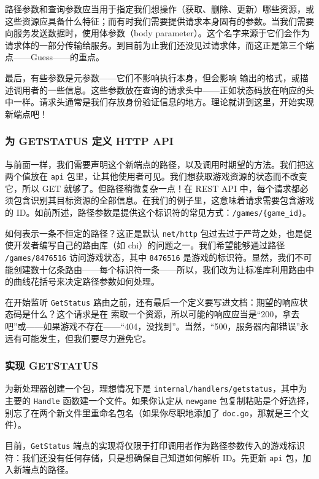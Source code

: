 路径参数和查询参数应当用于指定我们想操作（获取、删除、更新）哪些资源，或这些资源应具备什么特征；而有时我们需要提供请求本身固有的参数。当我们需要向服务发送数据时，使用体参数（body parameter）。这个名字来源于它们会作为请求体的一部分传输给服务。到目前为止我们还没见过请求体，而这正是第三个端点——Guess——的重点。

最后，有些参数是元参数——它们不影响执行本身，但会影响
输出的格式，或描述调用者的一些信息。这些参数放在查询的请求头中——正如状态码放在响应的头中一样。请求头通常是我们存放身份验证信息的地方。理论就讲到这里，开始实现新端点吧！

\subsubsection*{为 GETSTATUS 定义 HTTP API}

与前面一样，我们需要声明这个新端点的路径，以及调用时期望的方法。我们把这两个值放在 \texttt{api} 包里，让其他使用者可见。我们想获取游戏资源的状态而不改变它，所以 GET 就够了。但路径稍微复杂一点！在 REST API 中，每个请求都必须包含识别其目标资源的全部信息。在我们的例子里，这意味着请求需要包含游戏的 ID。如前所述，路径参数是提供这个标识符的常见方式：\texttt{/games/\{game\_id\}}。

如何表示一条不恒定的路径？这正是默认 \texttt{net/http} 包过去过于严苛之处，也是促使开发者编写自己的路由库（如 chi）的问题之一。我们希望能够通过路径 \texttt{/games/8476516} 访问游戏状态，其中 \texttt{8476516} 是游戏的标识符。显然，我们不可能创建数十亿条路由——每个标识符一条——所以，我们改为让标准库利用路由中的曲线花括号来决定路径参数如何处理。

在开始监听 \texttt{GetStatus} 路由之前，还有最后一个定义要写进文档：期望的响应状态码是什么？这个请求是在
索取一个资源，所以可能的响应应当是``200，拿去吧''或——如果游戏不存在——``404，没找到''。当然，``500，服务器内部错误''永远有可能发生，但我们要尽力避免它。

\subsubsection*{实现 GETSTATUS}

为新处理器创建一个包，理想情况下是 \texttt{internal/handlers/getstatus}，其中为主要的 \texttt{Handle} 函数建一个文件。如果你认定从 \texttt{newgame} 包复制粘贴是个好选择，别忘了在两个新文件里重命名包名（如果你尽职地添加了 \texttt{doc.go}，那就是三个文件）。

目前，\texttt{GetStatus} 端点的实现将仅限于打印调用者作为路径参数传入的游戏标识符：我们还没有任何存储，只是想确保自己知道如何解析 ID。先更新 \texttt{api} 包，加入新端点的路径。

